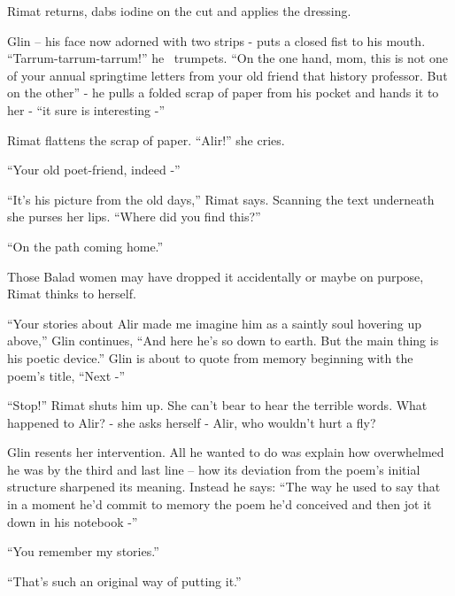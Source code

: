 \documentclass[twoside,11pt]{book}
\begin{document}
Rimat returns, dabs iodine on the cut and applies the
dressing.

Glin -- his face now adorned with two strips
- puts a closed fist
to his mouth. ``Tarrum-tarrum-tarrum!'' he \ trumpets. ``On the
one hand, mom, this is not one of your annual springtime letters from
your old friend that history professor. But on the
other'' - he pulls a folded scrap of paper from his pocket and hands it to her
- ``it sure is interesting -'' 

Rimat flattens the scrap of paper. ``Alir!'' she cries.

``Your old poet-friend, indeed -''

``It's his picture from the old days,'' Rimat says. Scanning the
text underneath she purses her lips. ``Where did you find this?'' 

``On the path coming home.'' 

Those Balad women may have dropped it accidentally or maybe on purpose, Rimat thinks to
herself. 

``Your stories about Alir made me imagine him as a
saintly soul hovering up above,'' Glin continues, ``And here he's so down to earth. But the
main thing is his poetic device.'' Glin is about to quote from memory beginning with the poem's title, ``Next -'' 

``Stop!'' Rimat shuts him
up. She can't bear to hear the terrible words. What happened to Alir?
- she asks herself - Alir, who wouldn't  hurt a fly?

Glin resents her intervention. All he wanted to do
was explain how overwhelmed he was by the third and last line -- how
its deviation from the poem's initial structure sharpened its meaning. Instead he says: ``The way he used to say that
in a moment he'd commit to memory the poem he'd conceived and then
jot it down in his notebook -'' 

``You remember my stories.'' 

``That's such an original way of putting it.''
\end{document}
